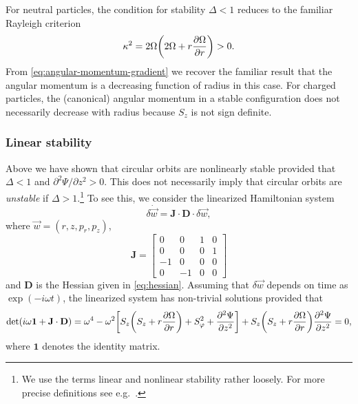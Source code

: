 \documentclass[aps,pre,notitlepage,amsmath,amssymb,amsfonts,nobibnotes,nofootinbib]{revtex4-1}
\begin{document}
For neutral particles, the condition for stability $\Delta<1$ reduces to the
familiar Rayleigh criterion
\begin{equation}
  \label{eq:global-rayleigh-criterion}
  \kappa^2 = 2\Omega\left(2\Omega + r\pder{\Omega}{r}\right) > 0.
\end{equation}
From \cref{eq:angular-momentum-gradient} we recover the familiar result
\citep[e.g.][]{Chandrasekhar1961} that the angular momentum is a decreasing
function of radius in this case. For charged particles, the (canonical)
angular momentum in a stable configuration does not necessarily decrease with
radius because $S_z$ is not sign definite.

\subsubsection{Linear stability}

Above we have shown that circular orbits are nonlinearly stable provided that
$\Delta<1$ and $\partial^2\Psi/\partial{}z^2>0$. This does not necessarily
imply that circular orbits are \emph{unstable} if $\Delta>1$.\footnote{We use
  the terms linear and nonlinear stability rather loosely. For more precise
  definitions see e.g.\ \citet{Holm1985}.} To see this, we consider the
linearized Hamiltonian system
\begin{equation}
  \delta\dot{\vec{w}} = \mathbf{J}\cdot\mathbf{D}\cdot\delta\vec{w},
\end{equation}
where $\vec{w}=(r,z,p_r,p_z)$,
\begin{equation}
  \mathbf{J} = \begin{bmatrix}
     0 &  0 & 1 & 0 \\
     0 &  0 & 0 & 1 \\
    -1 &  0 & 0 & 0 \\
     0 & -1 & 0 & 0
  \end{bmatrix}
\end{equation}
and $\mathbf{D}$ is the Hessian given in \cref{eq:hessian}. Assuming that
$\delta\vec{w}$ depends on time as $\exp(-i\omega{}t)$, the linearized system
has non-trivial solutions provided that
\begin{equation}
  \label{eq:solubility-condition}
  \det(i\omega\mathbf{1} + \mathbf{J}\cdot\mathbf{D}) =
  \omega^4 - \omega^2\left[
    S_z\left(S_z + r\pder{\Omega}{r}\right) + S_\varphi^2 + \pdder{\Psi}{z}
  \right]
  + S_z\left(S_z + r\pder{\Omega}{r}\right)\pdder{\Psi}{z} = 0,
\end{equation}
where $\mathbf{1}$ denotes the identity matrix.
\end{document}
